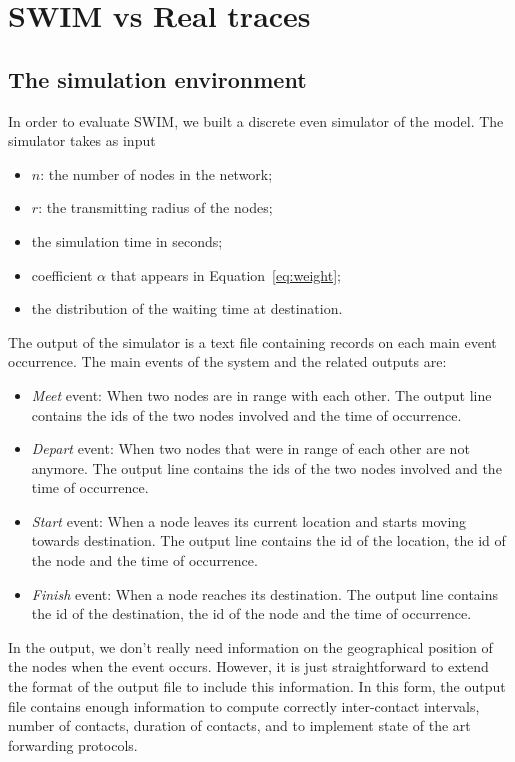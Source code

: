 \documentclass[conference]{IEEEtran}
\begin{document}
\section{SWIM vs Real traces}
\label{sec:experiments}

\subsection{The simulation environment}
In order to evaluate SWIM, we built a discrete even simulator of the model.
The simulator takes as input
\begin{itemize}
 \item $n$: the number of nodes in the network;
  \item $r$: the transmitting radius of the nodes;
  \item the simulation time in seconds;
  \item coefficient $\alpha$ that appears in Equation~\ref{eq:weight};
  \item the distribution of the waiting time at destination.
\end{itemize}
The output of the simulator is a text file containing records on each main event
occurrence. The main events of the system and the related outputs are:
\begin{itemize}
\item \emph{Meet} event: When two nodes are in range with each other. The
output line contains the ids of the two nodes involved and the time of
occurrence.
\item \emph{Depart} event: When two nodes that were in range of each other are
not anymore. The output line contains the ids of the two nodes involved and the
time of occurrence.
\item \emph{Start} event: When a node leaves its current location and starts
moving towards destination. The output line contains the id of the location, the
id of the node and the time of occurrence.
\item \emph{Finish} event: When a node reaches its destination. The output line
contains the id of the destination, the id of the node and the time of
occurrence.
\end{itemize}
In the output, we don't really need information on the geographical position of
the nodes when the event occurs. However, it is just straightforward to extend
the format of the output file to include this information. In this form, the
output file contains enough information to compute correctly inter-contact
intervals, number of contacts, duration of contacts, and to implement state of
the art forwarding protocols.
\end{document}
